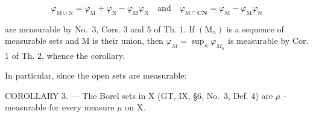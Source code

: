 \[
\varphi_ {\mathrm{M} \cup \mathrm{N}} = \varphi_ {\mathrm{M}} + \varphi_ {\mathrm{N}} - \varphi_ {\mathrm{M}} \varphi_ {\mathrm{N}} \quad \text {and} \quad \varphi_ {\mathrm{M} \cap \mathbf {C N}} = \varphi_ {\mathrm{M}} - \varphi_ {\mathrm{M}} \varphi_ {\mathrm{N}}
\]

are measurable by No.~3, Cors. 3 and 5 of Th. 1. If \((\mathrm{M}_{n})\) is a sequence of measurable sets and M is their union, then \(\varphi_{M} = \sup_{n} \varphi_{M_{n}}\) is measurable by Cor. 1 of Th. 2, whence the corollary.

In particular, since the open sets are measurable:

COROLLARY 3. --- The Borel sets in X (GT, IX, §6, No.~3, Def. 4) are \(\mu\) -measurable for every measure \(\mu\) on X.

